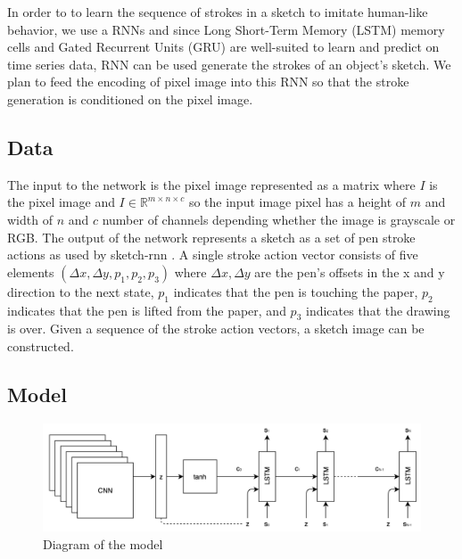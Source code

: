 \documentclass{article}
\begin{document}
In order to to learn the sequence of strokes in a sketch to imitate human-like behavior, we use a RNNs and since Long Short-Term Memory (LSTM) \cite{LSTM} memory cells and Gated Recurrent Units (GRU) \cite{GRU} are well-suited to learn and predict on time series data, RNN can be used generate the strokes of an object's sketch. We plan to feed the encoding of pixel image into this RNN so that the stroke generation is conditioned on the pixel image.

\subsection{Data}
The input to the network is the pixel image represented as a matrix where $I$ is the pixel image and $I\in \mathbb{R}^{m\times n\times c}$ so the input image pixel has a height of $m$ and width of $n$ and $c$ number of channels depending whether the image is grayscale or RGB. The output of the network represents a sketch as a set of pen stroke actions as used by sketch-rnn \cite{qdpaper}. A single stroke action vector consists of five elements $(\Delta x, \Delta y, p_{1}, p_{2}, p_{3})$ where $\Delta x, \Delta y$ are the pen's offsets in the x and y direction to the next state, $p_{1}$ indicates that the pen is touching the paper, $p_{2}$ indicates that the pen is lifted from the paper, and $p_{3}$ indicates that the drawing is over. Given a sequence of the stroke action vectors, a sketch image can be constructed.

\subsection{Model}
\begin{figure}[h]
\centering
\includegraphics[scale=0.5]{images/model.png}
\caption{Diagram of the model}
\end{figure}
\end{document}
